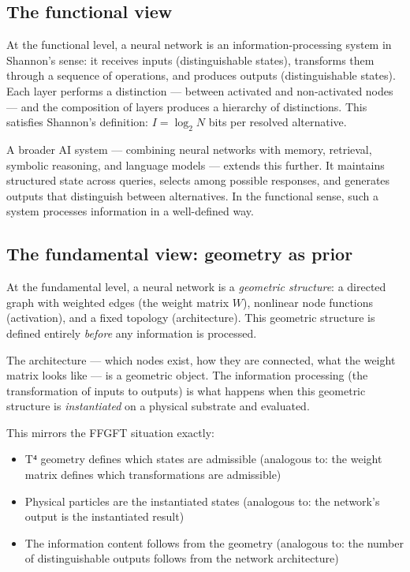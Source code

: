 \subsection{The functional view}

At the functional level, a neural network is an information-processing
system in Shannon's sense: it receives inputs (distinguishable states),
transforms them through a sequence of operations, and produces outputs
(distinguishable states). Each layer performs a distinction --- between
activated and non-activated nodes --- and the composition of layers
produces a hierarchy of distinctions. This satisfies Shannon's
definition: $I = \log_2 N$ bits per resolved alternative.

A broader AI system --- combining neural networks with memory,
retrieval, symbolic reasoning, and language models --- extends this
further. It maintains structured state across queries, selects among
possible responses, and generates outputs that distinguish between
alternatives. In the functional sense, such a system processes
information in a well-defined way.

\subsection{The fundamental view: geometry as prior}

At the fundamental level, a neural network is a \emph{geometric
structure}: a directed graph with weighted edges (the weight matrix
$W$), nonlinear node functions (activation), and a fixed topology
(architecture). This geometric structure is defined entirely
\emph{before} any information is processed.

The architecture --- which nodes exist, how they are connected, what
the weight matrix looks like --- is a geometric object. The
information processing (the transformation of inputs to outputs) is
what happens when this geometric structure is \emph{instantiated} on
a physical substrate and evaluated.

This mirrors the FFGFT situation exactly:
\begin{itemize}
  \item T⁴ geometry defines which states are admissible
        (analogous to: the weight matrix defines which transformations
        are admissible)
  \item Physical particles are the instantiated states
        (analogous to: the network's output is the instantiated result)
  \item The information content follows from the geometry
        (analogous to: the number of distinguishable outputs follows
        from the network architecture)
\end{itemize}

